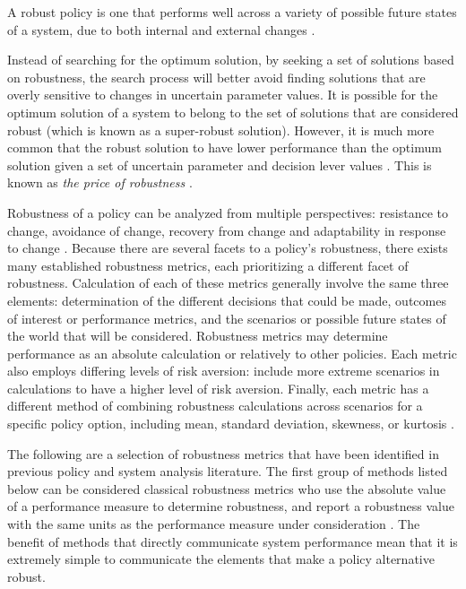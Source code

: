 \begin{conceptbox}\label{def:robustness}
    A robust policy is one that performs well across a variety of possible future states of a system, due to both internal and external changes \citep{Herman2015,Kasprzyk2013,Matrosov2013a,WalkerLempertKwakkel2013}. 
\end{conceptbox}

Instead of searching for the optimum solution, by seeking a set of solutions based on robustness, the search process will better avoid finding solutions that are overly sensitive to changes in uncertain parameter values. It is possible for the optimum solution of a system to belong to the set of solutions that are considered robust (which is known as a super-robust solution). However, it is much more common that the robust solution to have lower performance than the optimum solution given a set of uncertain parameter and decision lever values \citep{Sniedovich2016}. This is known as \textit{the price of robustness} \citep{Bertsimas2004}. 

Robustness of a policy can be analyzed from multiple perspectives: resistance to change, avoidance of change, recovery from change and adaptability in response to change \citep{Durach2015,DeGoede2013,Twomey2012}. Because there are several facets to a policy's robustness, there exists many established robustness metrics, each prioritizing a different facet of robustness. Calculation of each of these metrics generally involve the same three elements: determination of the different decisions that could be made, outcomes of interest or performance metrics, and the scenarios or possible future states of the world that will be considered. Robustness metrics may determine performance as an absolute calculation or relatively to other policies. Each metric also employs differing levels of risk aversion: include more extreme scenarios in calculations to have a higher level of risk aversion. Finally, each metric has a different method of combining robustness calculations across scenarios for a specific policy option, including mean, standard deviation, skewness, or kurtosis \citep{McPhail2018}.

The following are a selection of robustness metrics that have been identified in previous policy and system analysis literature. The first group of methods listed below can be considered classical robustness metrics who use the absolute value of a performance measure to determine robustness, and report a robustness value with the same units as the performance measure under consideration \citep{McPhail2018}. The benefit of methods that directly communicate system performance mean that it is extremely simple to communicate the elements that make a policy alternative robust. 

